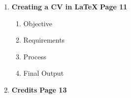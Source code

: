 \begin{enumerate}
    \item \textbf{Creating a CV in LaTeX} \hfill \textbf{Page 11}
    \begin{enumerate}
        \renewcommand{\labelenumii}{\arabic{enumi}.\arabic{enumii}}
        \item Objective
        \item Requirements
        \item Process
        \item Final Output
    \end{enumerate}
    
    \item \textbf{Credits} \hfill \textbf{Page 13}
\end{enumerate}
